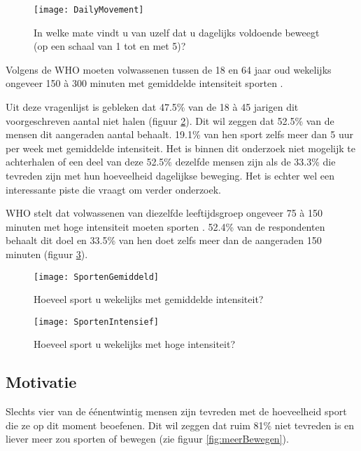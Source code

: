 \begin{figure}
    \caption[In welke mate vindt u van uzelf dat u dagelijks voldoende beweegt?]{In welke mate vindt u van uzelf dat u dagelijks voldoende beweegt (op een schaal van 1 tot en met 5)?}
    \texttt{[image: DailyMovement]}
    \label{fig:dagelijkseBeweging}
\end{figure}

Volgens de WHO moeten volwassenen tussen de 18 en 64 jaar oud wekelijks ongeveer 150 à 300 minuten met gemiddelde intensiteit sporten \autocite{Bull2020}.

Uit deze vragenlijst is gebleken dat 47.5\% van de 18 à 45 jarigen dit voorgeschreven aantal niet halen (figuur \ref{fig:gemiddeldSporten}). Dit wil zeggen dat 52.5\% van de mensen dit aangeraden aantal behaalt. 19.1\% van hen sport zelfs meer dan 5 uur per week met gemiddelde intensiteit. Het is binnen dit onderzoek niet mogelijk te achterhalen of een deel van deze 52.5\% dezelfde mensen zijn als de 33.3\% die tevreden zijn met hun hoeveelheid dagelijkse beweging. Het is echter wel een interessante piste die vraagt om verder onderzoek.

WHO stelt dat volwassenen van diezelfde leeftijdsgroep ongeveer 75 à 150 minuten met hoge intensiteit moeten sporten \autocite{Bull2020}.
52.4\% van de respondenten behaalt dit doel en 33.5\% van hen doet zelfs meer dan de aangeraden 150 minuten (figuur \ref{fig:intensiefSporten}).

\begin{figure}[h]
    \caption[Hoeveel sport u wekelijks met gemiddelde intensiteit?]{Hoeveel sport u wekelijks met gemiddelde intensiteit?}
    \texttt{[image: SportenGemiddeld]}
    \label{fig:gemiddeldSporten}
\end{figure}

\begin{figure}[h]
    \caption[Hoeveel sport u wekelijks met hoge intensiteit?]{Hoeveel sport u wekelijks met hoge intensiteit?}
    \texttt{[image: SportenIntensief]}
    \label{fig:intensiefSporten}
\end{figure}

\subsection{Motivatie}

Slechts vier van de éénentwintig mensen zijn tevreden met de hoeveelheid sport die ze op dit moment beoefenen. Dit wil zeggen dat ruim 81\% niet tevreden is en liever meer zou sporten of bewegen (zie figuur \ref{fig:meerBewegen}).

